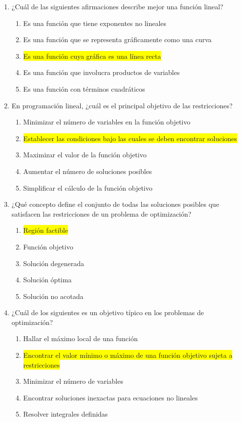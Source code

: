 \documentclass{article}
\begin{document}
\begin{enumerate}
\item ¿Cuál de las siguientes afirmaciones describe mejor una función lineal?
\begin{enumerate}
\item Es una función que tiene exponentes no lineales
\item Es una función que se representa gráficamente como una curva
\item \colorbox{yellow}{Es una función cuya gráfica es una línea recta}
\item Es una función que involucra productos de variables
\item Es una función con términos cuadráticos
\end{enumerate}

\item En programación lineal, ¿cuál es el principal objetivo de las restricciones?
\begin{enumerate}
\item Minimizar el número de variables en la función objetivo
\item \colorbox{yellow}{ Establecer las condiciones bajo las cuales se deben encontrar soluciones}
\item Maximizar el valor de la función objetivo
\item Aumentar el número de soluciones posibles
\item Simplificar el cálculo de la función objetivo
\end{enumerate}

\item ¿Qué concepto define el conjunto de todas las soluciones posibles que satisfacen las restricciones de un problema de optimización?
\begin{enumerate}
\item \colorbox{yellow}{Región factible}
\item Función objetivo
\item Solución degenerada
\item Solución óptima
\item Solución no acotada
\end{enumerate}

\item ¿Cuál de los siguientes es un objetivo típico en los problemas de optimización?
\begin{enumerate}
\item Hallar el máximo local de una función
\item \colorbox{yellow}{Encontrar el valor mínimo o máximo de una función objetivo sujeta a restricciones}
\item Minimizar el número de variables
\item Encontrar soluciones inexactas para ecuaciones no lineales
\item Resolver integrales definidas
\end{enumerate}


\end{enumerate}
\end{document}
